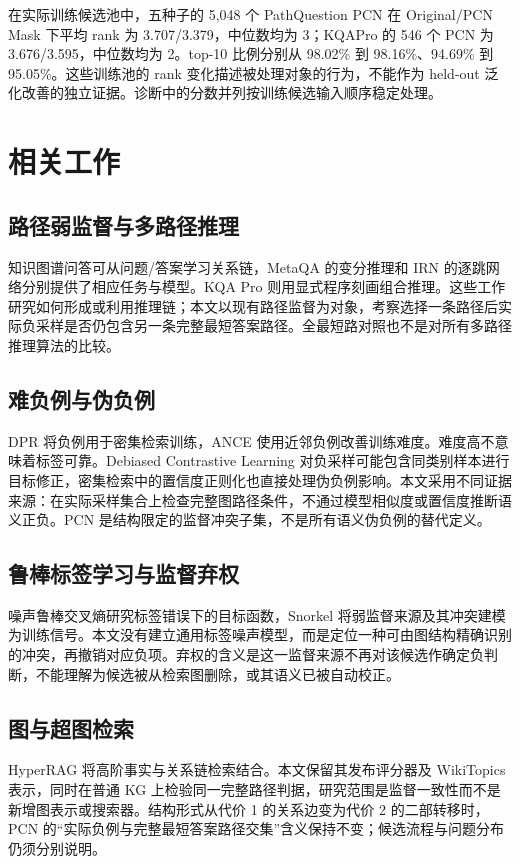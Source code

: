 \documentclass[UTF8,a4paper,10pt,fontset=fandol]{ctexart}
\begin{document}
在实际训练候选池中，五种子的 5,048 个 PathQuestion PCN 在 Original/PCN Mask 下平均 rank 为 3.707/3.379，中位数均为 3；KQAPro 的 546 个 PCN 为 3.676/3.595，中位数均为 2。top-10 比例分别从 98.02\% 到 98.16\%、94.69\% 到 95.05\%。这些训练池的 rank 变化描述被处理对象的行为，不能作为 held-out 泛化改善的独立证据。诊断中的分数并列按训练候选输入顺序稳定处理。

\section{相关工作}
\subsection{路径弱监督与多路径推理}
知识图谱问答可从问题/答案学习关系链，MetaQA 的变分推理和 IRN 的逐跳网络分别提供了相应任务与模型\cite{metaqa,pq}。KQA Pro 则用显式程序刻画组合推理\cite{kqa}。这些工作研究如何形成或利用推理链；本文以现有路径监督为对象，考察选择一条路径后实际负采样是否仍包含另一条完整最短答案路径。全最短路对照也不是对所有多路径推理算法的比较。

\subsection{难负例与伪负例}
DPR 将负例用于密集检索训练，ANCE 使用近邻负例改善训练难度\cite{dpr,ance}。难度高不意味着标签可靠。Debiased Contrastive Learning 对负采样可能包含同类别样本进行目标修正\cite{debiased}，密集检索中的置信度正则化也直接处理伪负例影响\cite{false_negative}。本文采用不同证据来源：在实际采样集合上检查完整图路径条件，不通过模型相似度或置信度推断语义正负。PCN 是结构限定的监督冲突子集，不是所有语义伪负例的替代定义。

\subsection{鲁棒标签学习与监督弃权}
噪声鲁棒交叉熵研究标签错误下的目标函数\cite{gce}，Snorkel 将弱监督来源及其冲突建模为训练信号\cite{snorkel}。本文没有建立通用标签噪声模型，而是定位一种可由图结构精确识别的冲突，再撤销对应负项。弃权的含义是这一监督来源不再对该候选作确定负判断，不能理解为候选被从检索图删除，或其语义已被自动校正。

\subsection{图与超图检索}
HyperRAG 将高阶事实与关系链检索结合\cite{hyperrag}。本文保留其发布评分器及 WikiTopics 表示，同时在普通 KG 上检验同一完整路径判据，研究范围是监督一致性而不是新增图表示或搜索器。结构形式从代价 1 的关系边变为代价 2 的二部转移时，PCN 的“实际负例与完整最短答案路径交集”含义保持不变；候选流程与问题分布仍须分别说明。
\end{document}
